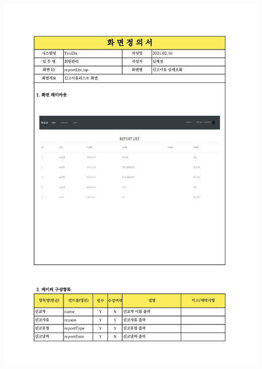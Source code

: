 {{{{{{{{{{{{{{{\includegraphics[width=20cm]{./Figure/Design/Display/user/user_15.pdf} \\
}}}}}}}}}}}}}}}
